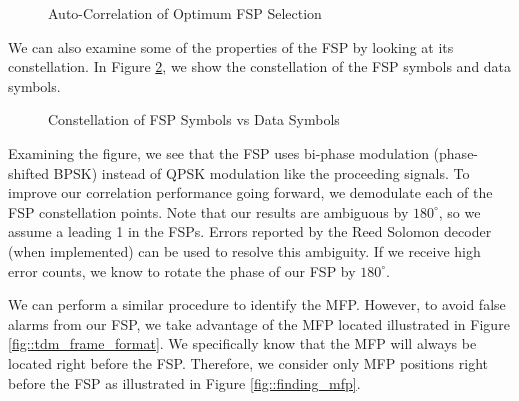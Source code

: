 \documentclass[conference,onecolumn]{IEEEtran}
\begin{document}
\begin{figure}[H]
	\centerline{}
	\caption{Auto-Correlation of Optimum FSP Selection}
	\label{fig::fsp_correlation}
\end{figure}

We can also examine some of the properties of the FSP by looking at its constellation. In Figure \ref{fig::fsp_constellation}, we show the constellation of the FSP symbols and data symbols.

\begin{figure}[H]
	\centerline{}
	\caption{Constellation of FSP Symbols vs Data Symbols}
	\label{fig::fsp_constellation}
\end{figure}

Examining the figure, we see that the FSP uses bi-phase modulation (phase-shifted BPSK) instead of QPSK modulation like the proceeding signals. To 
improve our correlation performance going forward, we demodulate each of the FSP constellation points. Note that our results are ambiguous by $180^{\circ}$, so we assume a leading 1 in the FSPs. Errors reported by the Reed Solomon decoder (when implemented) can be used to resolve this ambiguity. If we receive high error counts, we know to rotate the phase of our FSP by $180^{\circ}$.

We can perform a similar procedure to identify the MFP. However, to avoid false alarms from our FSP, we take advantage of the MFP located illustrated in Figure \ref{fig::tdm_frame_format}. We specifically know that the MFP will always be located right before the FSP. Therefore, we consider only MFP positions right before the FSP as illustrated in Figure \ref{fig::finding_mfp}.
\end{document}
